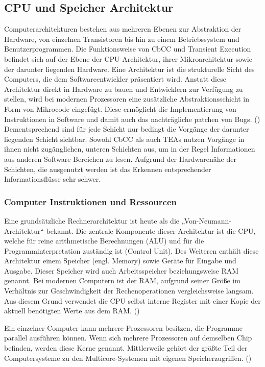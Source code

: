 
\subsection{\ac{CPU} und Speicher Architektur}
Computerarchitekturen bestehen aus mehreren Ebenen zur
Abstraktion der Hardware, von einzelnen Transistoren bis hin
zu einem Betriebssystem und Benutzerprogrammen.
Die Funktionsweise von \ac{CbCC} und
Transient Execution befindet sich auf der Ebene der
\ac{CPU}-Architektur, ihrer Mikroarchitektur sowie der
darunter liegenden Hardware.
Eine Architektur ist die strukturelle Sicht des Computers, die
dem Softwareentwickler präsentiert wird.
Anstatt diese Architektur direkt in Hardware zu bauen und
Entwicklern zur Verfügung zu stellen, wird bei modernen
Prozessoren eine zusätzliche Abstraktionsschicht in Form von
Mikrocode eingefügt. Diese ermöglicht die Implementierung
von Instruktionen in Software und damit auch das nachträgliche
patchen von Bugs.
(\cite[14,379]{sarangi_basic_2021})
Dementsprechend sind für jede Schicht nur bedingt die Vorgänge
der darunter liegenden Schicht sichtbar. Sowohl \ac{CbCC} als
auch \acp{TEA}
nutzen Vorgänge in ihnen nicht zugänglichen, unteren Schichten
aus, um in der Regel Informationen aus anderen Software
Bereichen zu lesen. Aufgrund der Hardwarenähe der Schichten,
die ausgenutzt werden ist das Erkennen entsprechender
Informationsflüsse sehr schwer.

\subsubsection{Computer Instruktionen und Ressourcen}
Eine grundsätzliche Rechnerarchitektur ist heute als die
„Von-Neumann-Architektur“ bekannt. Die zentrale Komponente
dieser Architektur ist die \ac{CPU}, welche für reine
arithmetische Berechnungen (\ac{ALU}) und für die
Programminterpretation zuständig ist
(Control Unit). Des Weiteren enthält diese Architektur einem
Speicher (engl. Memory) sowie Geräte für Eingabe und
Ausgabe. Dieser Speicher wird auch Arbeitsspeicher
beziehungsweise \ac{RAM} genannt.
Bei modernen Computern ist der \ac{RAM}, aufgrund seiner Größe im
Verhältnis zur Geschwindigkeit der Rechenoperationen
vergleichsweise langsam.
Aus diesem Grund verwendet die \ac{CPU} selbst interne Register mit
einer Kopie der aktuell benötigten Werte aus dem \ac{RAM}.
(\cite[35]{sarangi_basic_2021})

Ein einzelner Computer kann mehrere Prozessoren besitzen, die
Programme parallel ausführen können. Wenn sich mehrere
Prozessoren auf demselben Chip befinden, werden diese Kerne
genannt. Mittlerweile gehört der größte Teil der Computersysteme
zu den Multicore-Systemen mit eigenen Speicherzugriffen.
(\cite[569,578]{sarangi_basic_2021})

